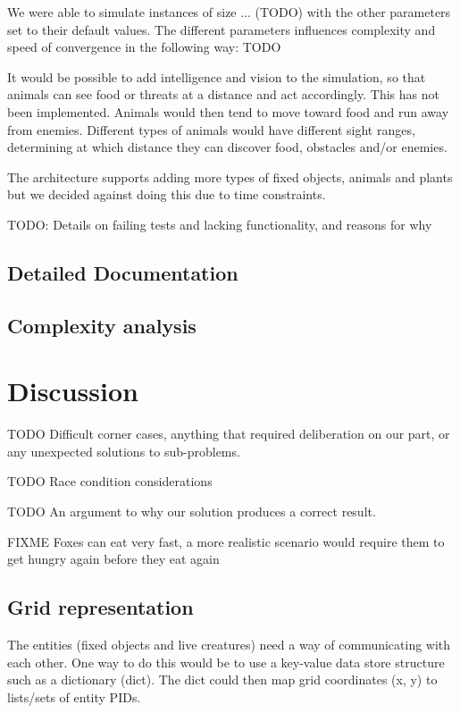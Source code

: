 \documentclass[12pt]{article}
\begin{document}
We were able to simulate instances of size ... (TODO) with the other parameters set to their default values. The different parameters influences complexity and speed of convergence in the following way: TODO

It would be possible to add intelligence and vision to the simulation, so that animals can see food or threats at a distance and act accordingly. This has not been implemented. Animals would then tend to move toward food and run away from enemies. Different types of animals would have different sight ranges, determining at which distance they can discover food, obstacles and/or enemies.

The architecture supports adding more types of fixed objects, animals and plants but we decided against doing this due to time constraints.

TODO: Details on failing tests and lacking functionality, and reasons for why

\subsection{Detailed Documentation} %

\subsection{Complexity analysis}

\section{Discussion}

TODO Difficult corner cases, anything that required deliberation on our part, or any unexpected solutions to sub-problems.

TODO Race condition considerations

TODO An argument to why our solution produces a correct result.

FIXME Foxes can eat very fast, a more realistic scenario would require them to get hungry again before they eat again

\subsection{Grid representation}

The entities (fixed objects and live creatures) need a way of communicating with each other. One way to do this would be to use a key-value data store structure such as a dictionary (dict). The dict could then map grid coordinates (x, y) to lists/sets of entity PIDs.
\end{document}

